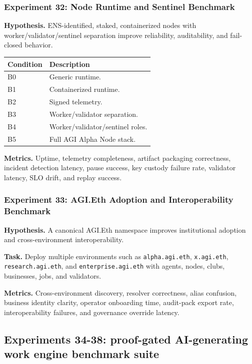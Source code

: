 \documentclass[
  11pt,
]{article}
\begin{document}
\subsubsection{Experiment 32: Node Runtime and Sentinel
Benchmark}\label{experiment-32-node-runtime-and-sentinel-benchmark}

\textbf{Hypothesis.} ENS-identified, staked, containerized nodes with
worker/validator/sentinel separation improve reliability, auditability,
and fail-closed behavior.

\begin{longtable}[]{@{}ll@{}}
\toprule\noalign{}
Condition & Description \\
\midrule\noalign{}
\endhead
\bottomrule\noalign{}
\endlastfoot
B0 & Generic runtime. \\
B1 & Containerized runtime. \\
B2 & Signed telemetry. \\
B3 & Worker/validator separation. \\
B4 & Worker/validator/sentinel roles. \\
B5 & Full AGI Alpha Node stack. \\
\end{longtable}

\textbf{Metrics.} Uptime, telemetry completeness, artifact packaging
correctness, incident detection latency, pause success, key custody
failure rate, validator latency, SLO drift, and replay success.

\subsubsection{Experiment 33: AGI.Eth Adoption and Interoperability
Benchmark}\label{experiment-33-agi.eth-adoption-and-interoperability-benchmark}

\textbf{Hypothesis.} A canonical AGI.Eth namespace improves
institutional adoption and cross-environment interoperability.

\textbf{Task.} Deploy multiple environments such as
\texttt{alpha.agi.eth}, \texttt{x.agi.eth}, \texttt{research.agi.eth},
and \texttt{enterprise.agi.eth} with agents, nodes, clubs, businesses,
jobs, and validators.

\textbf{Metrics.} Cross-environment discovery, resolver correctness,
alias confusion, business identity clarity, operator onboarding time,
audit-pack export rate, interoperability failures, and governance
override latency.

\subsection{Experiments 34-38: proof-gated AI-generating work engine
benchmark
suite}\label{experiments-34-38-proof-gated-ai-generating-work-engine-benchmark-suite}
\end{document}
